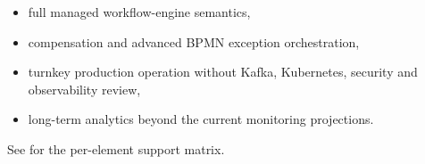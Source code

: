 \begin{itemize}
\item full managed workflow-engine semantics,
\item compensation and advanced BPMN exception orchestration,
\item turnkey production operation without Kafka, Kubernetes, security and
  observability review,
\item long-term analytics beyond the current monitoring projections.
\end{itemize}

See  for the per-element support matrix.
